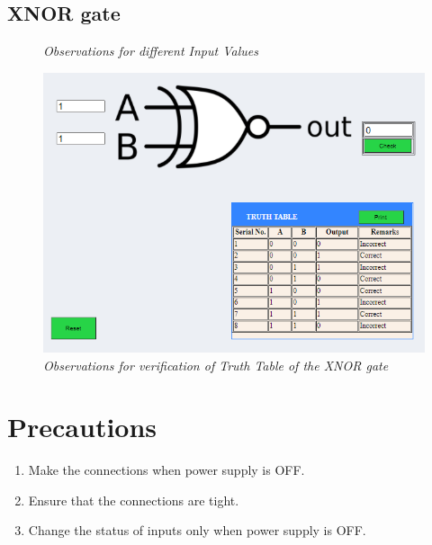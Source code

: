 \pagebreak
	\subsection{XNOR gate}
			\begin{figure}[ht]
				\centering 
				\hfill
				\caption{\textit{Observations for different Input Values}}
			\end{figure}
			\begin{figure}[h]
				\centering
				\includegraphics[width=0.85\linewidth]{img/exp3/fig12}
				\caption{\textit{Observations for verification of Truth Table of the XNOR gate}}
				\label{fig:xnor_obs_2}
			\end{figure}
			
\section{Precautions}
	\begin{enumerate}
		\tightlist
		\item Make the connections when power supply is OFF.
		\item Ensure that the connections are tight.
		\item Change the status of inputs only when power supply is OFF.
	\end{enumerate}